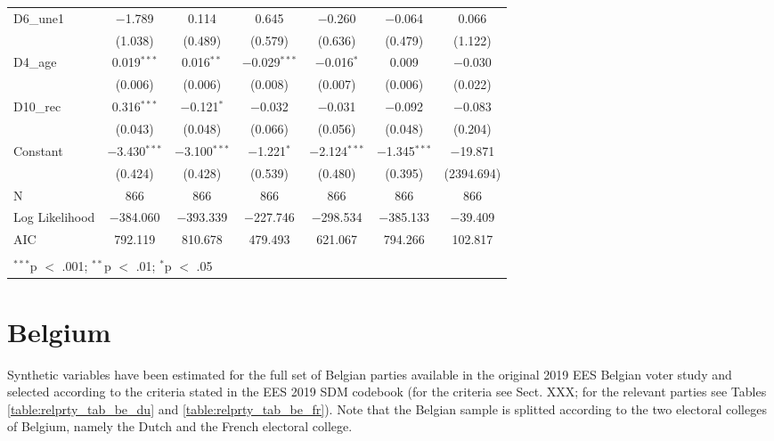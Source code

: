 \documentclass[
]{article}
\begin{document}
\begin{table}[!htbp]
\begin{tabular}{@{\extracolsep{5pt}}lcccccc}
  D6\_une1 & $-$1.789 & 0.114 & 0.645 & $-$0.260 & $-$0.064 & 0.066 \\ 
  & (1.038) & (0.489) & (0.579) & (0.636) & (0.479) & (1.122) \\ 
  D4\_age & 0.019$^{***}$ & 0.016$^{**}$ & $-$0.029$^{***}$ & $-$0.016$^{*}$ & 0.009 & $-$0.030 \\ 
  & (0.006) & (0.006) & (0.008) & (0.007) & (0.006) & (0.022) \\ 
  D10\_rec & 0.316$^{***}$ & $-$0.121$^{*}$ & $-$0.032 & $-$0.031 & $-$0.092 & $-$0.083 \\ 
  & (0.043) & (0.048) & (0.066) & (0.056) & (0.048) & (0.204) \\ 
  Constant & $-$3.430$^{***}$ & $-$3.100$^{***}$ & $-$1.221$^{*}$ & $-$2.124$^{***}$ & $-$1.345$^{***}$ & $-$19.871 \\ 
  & (0.424) & (0.428) & (0.539) & (0.480) & (0.395) & (2394.694) \\ 
 N & 866 & 866 & 866 & 866 & 866 & 866 \\ 
Log Likelihood & $-$384.060 & $-$393.339 & $-$227.746 & $-$298.534 & $-$385.133 & $-$39.409 \\ 
AIC & 792.119 & 810.678 & 479.493 & 621.067 & 794.266 & 102.817 \\ 
\hline \\[-1.8ex] 
\multicolumn{7}{l}{$^{***}$p $<$ .001; $^{**}$p $<$ .01; $^{*}$p $<$ .05} \\ 
\end{tabular} 
\end{table}

\clearpage

\newpage

\hypertarget{belgium}{%
\section{Belgium}\label{belgium}}

Synthetic variables have been estimated for the full set of Belgian parties available in the original
2019 EES Belgian voter study and selected according to the criteria stated in the EES 2019 SDM codebook (for the criteria see Sect. XXX; for the relevant parties see Tables \ref{table:relprty_tab_be_du} and \ref{table:relprty_tab_be_fr}).
Note that the Belgian sample is splitted according to the two electoral colleges of Belgium, namely the Dutch and the French electoral college.
\end{document}
